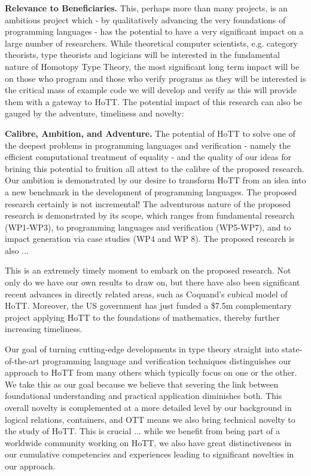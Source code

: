\documentclass[a4paper,11pt]{article}
\begin{document}
\vspace*{-0.1in}


{\bf Relevance to Beneficiaries.} This, perhaps more than many
projects, is an ambitious project which - by qualitatively advancing
the very foundations of programming languages - has the potential to
have a very significant impact on a large number of researchers. While
theoretical computer scientists, e.g. category theorists, type
theorists and logicians will be interested in the fundamental nature
of Homotopy Type Theory, the most significant long term impact will be
on those who program and those who verify programs as they will be
interested is the critical mass of example code we will develop and
verify as this will provide them with a gateway to HoTT. The potential
impact of this research can also be gauged by the adventure,
timeliness and novelty:

{\bf Calibre, Ambition, and Adventure.} The potential of HoTT to solve
one of the deepest problems in programming languages and verification
- namely the efficient computational treatment of equality - and the
quality of our ideas for brining this potential to fruition all attest
to the calibre of the proposed research. Our ambition is demonstrated
by our desire to transform HoTT from an idea into a new
benchmark in the development of programming languages. The proposed
research certainly is not incremental! The adventurous nature of the
proposed research is demonstrated by its scope, which ranges from
fundamental research (WP1-WP3), to programming languages and
verification (WP5-WP7), and to impact generation via case studies (WP4 and
WP 8). The proposed research is also ...

 This is an extremely timely moment to
embark on the proposed research. Not only do we have our own results
to draw on, but there have also been significant recent advances in
directly related areas, such as Coquand's cubical model of HoTT.
Moreover, the US government has just funded a \$7.5m complementary
project applying HoTT to the foundations of mathematics, thereby
further increasing timeliness.

Our goal of turning cutting-edge developments in type theory straight
into state-of-the-art programming language and verification techniques
distinguishes our approach to HoTT from many others which typically
focus on one or the other. We take this as our goal because we believe
that severing the link between foundational understanding and
practical application diminishes both. This overall novelty is
complemented at a more detailed level by our background in logical
relations, containers, and OTT means we also bring technical novelty
to the study of HoTT. This is crucial ... while we benefit from being
part of a worldwide community working on HoTT, we also have great
distinctiveness in our cumulative competencies and experiences leading to 
significant novelties in our approach.
 
\end{document}
